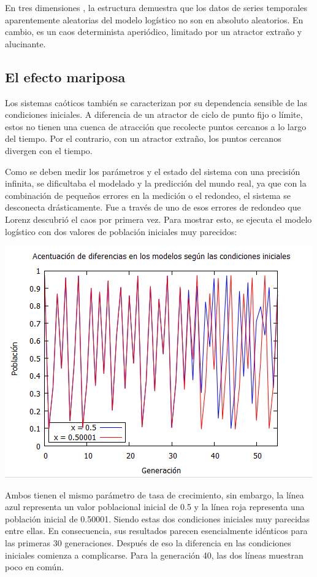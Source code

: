\documentclass{article}
\begin{document}
En tres dimensiones , la estructura demuestra que los datos de series temporales aparentemente aleatorias del modelo logístico no son en absoluto aleatorios. En cambio, es un caos determinista aperiódico, limitado por un atractor extraño y alucinante.

\subsection{El efecto mariposa}

Los sistemas caóticos también se caracterizan por su dependencia sensible de las condiciones iniciales. A diferencia de un atractor de ciclo de punto fijo o límite, estos no tienen una cuenca de atracción que recolecte puntos cercanos a lo largo del tiempo. Por el contrario, con un atractor extraño, los puntos cercanos divergen con el tiempo.

Como se deben medir los parámetros y el estado del sistema con una precisión infinita, se dificultaba el modelado y la predicción del mundo real, ya que con la combinación de pequeños errores en la medición o el redondeo, el sistema se desconecta drásticamente. Fue a través de uno de esos errores de redondeo que Lorenz descubrió el caos por primera vez. Para mostrar esto, se ejecuta el modelo logístico con dos valores de población iniciales muy parecidos:

\begin{center}
\includegraphics[width=.8\textwidth]{Imagen12.PNG}
\end{center}

Ambos tienen el mismo parámetro de tasa de crecimiento, sin embargo, la línea azul representa un valor poblacional inicial de 0.5 y la línea roja representa una población inicial de 0.50001. Siendo estas dos condiciones iniciales muy parecidas entre ellas. En consecuencia, sus resultados parecen esencialmente idénticos para las primeras 30 generaciones. Después de eso la diferencia en las condiciones iniciales comienza a complicarse. Para la generación 40, las dos líneas muestran poco en común.
\end{document}
